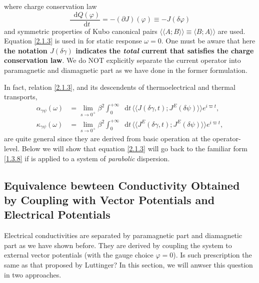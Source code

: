 \documentclass[10pt,nofootinbib,letterpaper]{revtex4}
\newcommand*\dd{\mathop{}\!\mathrm{d}}
\newcounter{Note}[section]
\newenvironment{Note}[1][]{{\par\normalfont\bfseries \underline{Note~\stepcounter{Note}\arabic{Note}.}~#1~~}}{\par}
\begin{document}
		where charge conservation law
		\begin{equation}\label{2.1.4}
			\dfrac{\dd Q(\varphi)}{\dd t}=-(\partial J)(\varphi)\equiv-J(\delta\varphi)
		\end{equation}
		and symmetric properties of Kubo canonical pairs $\langle\langle A;B\rangle\rangle\equiv\langle B;A\rangle\rangle$ are used. Equation \eqref{2.1.3} is used in \cite{kapustin2020thermal} for static response $\omega=0$.
		\begin{Note}
			One must be aware that here \textbf{the notation $J(\delta\gamma)$ indicates the \emph{total} current that satisfies the charge conservation law}. We do NOT explicitly separate the current operator into paramagnetic and diamagnetic part as we have done in the former formulation.
		\end{Note}
		\begin{Note}
			In fact, relation \eqref{2.1.3}, and its descendents of thermoelectrical and thermal transports,
			{\color{red}\begin{align}
				\alpha_{\gamma\psi}(\omega)&=\lim_{s \rightarrow0^+}\beta^2\int_0^{+\infty}\dd t\,\langle\langle J(\delta\gamma,t); J^E(\delta\psi)\rangle\rangle e^{i\varpi t},\label{2.1.5}\\
				\kappa_{\gamma\psi}(\omega)&=\lim_{s \rightarrow0^+}\beta^2\int_0^{+\infty}\dd t\,\langle\langle J^E(\delta\gamma,t); J^E(\delta\psi)\rangle\rangle e^{i\varpi t},\label{2.1.6}
			\end{align}}
			are quite general since they are derived from basic operation at the operator-level. Below we will show that equation \eqref{2.1.3} will go back to the familiar form \eqref{1.3.8} if is applied to a system of \emph{parabolic} dispersion.
		\end{Note}

	\subsection{Equivalence bewteen Conductivity Obtained by Coupling with Vector Potentials and Electrical Potentials}
		Electrical conductivities are separated by paramagnetic part and diamagnetic part as we have shown before. They are derived by coupling the system to external vector potentials (with the gauge choice $\varphi=0$). Is such prescription the same as that proposed by Luttinger? In this section, we will anwser this question in two approaches.\par
\end{document}
